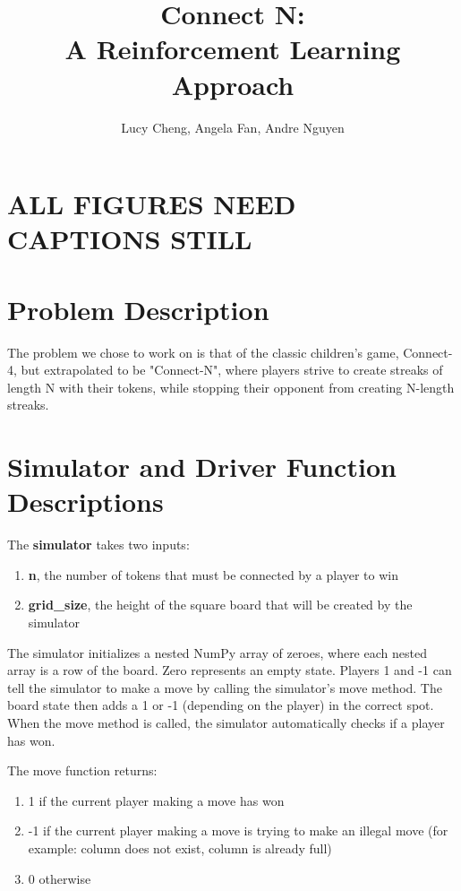 \documentclass[12pt]{article}
\newcommand*{\TitleFont}{%
      \usefont{\encodingdefault}{\rmdefault}{n}{b}%
      \fontsize{14}{16}%
      \selectfont}
\begin{document}
\title{\TitleFont \textbf{Connect N:\\ A Reinforcement Learning Approach}}
\author{\TitleFont Lucy Cheng, Angela Fan, Andre Nguyen}
\maketitle

\vspace{-1.5cm}

\section*{ALL FIGURES NEED CAPTIONS STILL}

\section{Problem Description}

The problem we chose to work on is that of the classic children's game, Connect-4, but extrapolated to be "Connect-N", where players strive to create streaks of length N with their tokens, while stopping their opponent from creating N-length streaks.

\section{Simulator and Driver Function Descriptions}

The \textbf{simulator} takes two inputs:
\begin{enumerate}
\item \textbf{n}, the number of tokens that must be connected by a player to win
\item \textbf{grid\_size}, the height of the square board that will be created by the simulator
\end{enumerate}

The simulator initializes a nested NumPy array of zeroes, where each nested array is a row of the board. Zero represents an empty state. Players 1 and -1 can tell the simulator to make a move by calling the simulator's move method. The board state then adds a 1 or -1 (depending on the player) in the correct spot. When the move method is called, the simulator automatically checks if a player has won. 

The move function returns:

\begin{enumerate}
\item 1 if the current player making a move has won
\item -1 if the current player making a move is trying to make an illegal move (for example: column does not exist, column is already full)
\item 0 otherwise
\end{enumerate}
\end{document}
